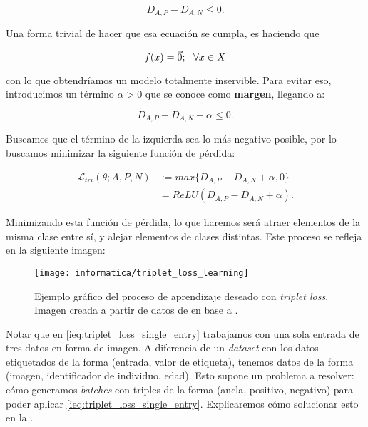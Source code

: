\begin{equation}
	D_{A, P} - D_{A, N} \leq 0.
\end{equation}

Una forma trivial de hacer que esa ecuación se cumpla, es haciendo que

\begin{equation}
	f(x) = \vec{0}; \ \  \forall x \in X
\end{equation}

con lo que obtendríamos un modelo totalmente inservible. Para evitar eso, introducimos un término $\alpha > 0$ que se conoce como \textbf{margen}, llegando a:

\begin{equation}
	D_{A, P} - D_{A, N} + \alpha \leq 0.
\end{equation}

Buscamos que el término de la izquierda sea lo más negativo posible, por lo buscamos minimizar la siguiente función de pérdida:

\begin{equation} \label{ieq:triplet_loss_single_entry}
	\begin{split}
		\mathcal{L}_{tri}(\theta; A, P, N) & := max \{D_{A, P} - D_{A, N} + \alpha, 0 \} \\
		&= ReLU(D_{A, P} - D_{A, N} + \alpha).
	\end{split}
\end{equation}

Minimizando esta función de pérdida, lo que haremos será atraer elementos de la misma clase entre sí, y alejar elementos de clases distintas. Este proceso se refleja en la siguiente imagen:

\begin{figure}[H]
	\centering
	\texttt{[image: informatica/triplet\_loss\_learning]}
	\caption{Ejemplo gráfico del proceso de aprendizaje deseado con \textit{triplet loss}. Imagen creada a partir de datos de \cite{informatica:cacd_dataset} en base a \cite{informatica:facenet}.}
\end{figure}

Notar que en \eqref{ieq:triplet_loss_single_entry} trabajamos con una sola entrada de tres datos en forma de imagen. A diferencia de un \textit{dataset} con los datos etiquetados de la forma (entrada, valor de etiqueta), tenemos datos de la forma (imagen, identificador de individuo, edad). Esto supone un problema a resolver: cómo generamos \textit{batches} con triples de la forma (ancla, positivo, negativo) para poder aplicar \eqref{ieq:triplet_loss_single_entry}. Explicaremos cómo solucionar esto en la .

